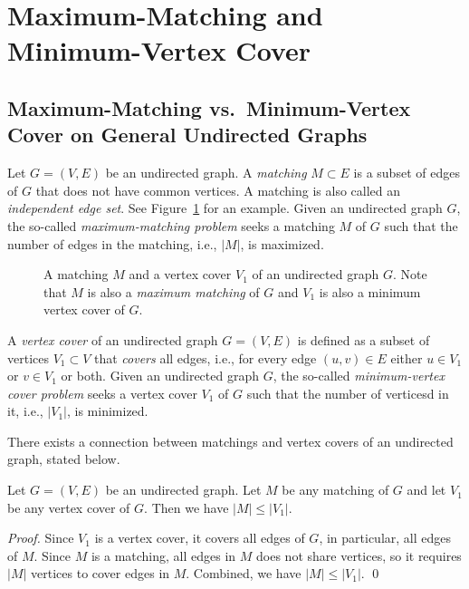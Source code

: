 \setcounter{definition}{0} \setcounter{property}{0} \setcounter{claim}{0} \setcounter{fact}{0} \setcounter{corollary}{0} \setcounter{figure}{0}
\section{Maximum-Matching and Minimum-Vertex Cover}


\subsection*{Maximum-Matching vs.\ Minimum-Vertex Cover on General Undirected Graphs}

Let $G = (V, E)$ be an undirected graph. A \emph{matching} $M \subset E$ 
is a subset of edges of $G$ that does not have common vertices.
A matching is also called an \emph{independent edge set}.
See Figure~\ref{fig:matching} for an example.
Given an undirected graph $G$, the so-called \emph{maximum-matching problem}
seeks a matching $M$ of $G$ such that the number of edges in the matching, i.e., $|M|$, 
is maximized.

\begin{figure}[h]
\centering{}
\caption{A matching $M$ and a vertex cover $V_1$ of an undirected graph $G$. 
Note that $M$ is also a \emph{maximum matching} of $G$ and $V_1$ is also a minimum vertex cover of $G$.}
\label{fig:matching}
\end{figure}

A \emph{vertex cover} of an undirected graph $G = (V, E)$ is defined
as a subset of vertices $V_1\subset V$ that \emph{covers} all edges, i.e., for every edge $(u, v)\in E$ either
$u\in V_1$ or $v\in V_1$ or both.
Given an undirected graph $G$, the so-called \emph{minimum-vertex cover problem}
seeks a vertex cover $V_1$ of $G$ such that the number of verticesd in it, i.e., $|V_1|$, is minimized.


There exists a connection between matchings and vertex covers of an undirected graph, stated below.

\begin{claim}
Let $G = (V, E)$ be an undirected graph. Let $M$ be any matching of $G$ and let $V_1$ be any vertex cover of $G$.
Then we have $|M| \le |V_1|$.
\end{claim}

\emph{Proof.} Since $V_1$ is a vertex cover, it covers all edges of $G$, in particular, all edges of $M$.
Since $M$ is a matching, all edges in $M$ does not share vertices, so it requires $|M|$ vertices to cover edges in $M$.
Combined, we have $|M| \le |V_1|$. \qed

